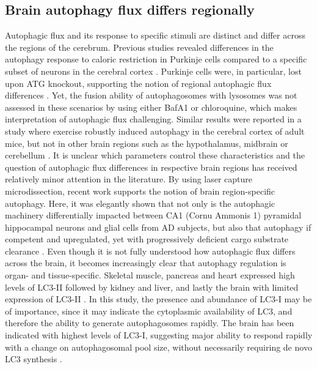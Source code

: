 \subsection{Brain autophagy flux differs regionally}
Autophagic flux and its response to specific stimuli are distinct and differ across the regions of the cerebrum. Previous studies revealed differences in the autophagy response to caloric restriction in Purkinje cells compared to a specific subset of neurons in the cerebral cortex \citep{Alirezaei2010}. Purkinje cells were, in particular, lost upon ATG knockout, supporting the notion of regional autophagic flux differences \citep{Alirezaei2010,Hara2006,Komatsu2006}. Yet, the fusion ability of autophagosomes with lysosomes was not assessed in these scenarios by using either BafA1 or chloroquine, which makes interpretation of autophagic flux challenging. Similar results were reported in a study where exercise robustly induced autophagy in the cerebral cortex of adult mice, but not in other brain regions such as the hypothalamus, midbrain or cerebellum \citep{He2012}. It is unclear which parameters control these characteristics and the question of autophagic flux differences in respective brain regions has received relatively minor attention in the literature. By using laser capture microdissection, recent work supports the notion of brain region-specific autophagy. Here, it was elegantly shown that not only is the autophagic machinery differentially impacted between CA1 (Cornu Ammonis 1) pyramidal hippocampal neurons and glial cells from AD subjects, but also that autophagy if competent and upregulated, yet with progressively deficient cargo substrate clearance \citep{Bordi2016}. Even though it is not fully understood how autophagic flux differs across the brain, it becomes increasingly clear that autophagy regulation is organ- and tissue-specific. Skeletal muscle, pancreas and heart expressed high levels of LC3-II followed by kidney and liver, and lastly the brain with limited expression of LC3-II \citep{Mizushima2004a}. In this study, the presence and abundance of LC3-I may be of importance, since it may indicate the cytoplasmic availability of LC3, and therefore the ability to generate autophagosomes rapidly. The brain has been indicated with highest levels of LC3-I, suggesting major ability to respond rapidly with a change on autophagosomal pool size, without necessarily requiring de novo LC3 synthesis \citep{Mizushima2004a}.


